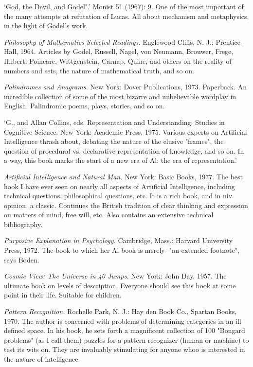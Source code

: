  `God, the Devil, and Godel".' Monist 51 (1967): 9. One of the most important of the many attempts at refutation of Lucas. All about mechanism and metaphysics, in the light of Godel's work.

 {\sl Philosophy of Mathematics-Selected Readings.} Englewood Cliffs, N. J.: Prentice-Hall, 1964. Articles by Godel, Russell, Nagel, von Neumann, Brouwer, Frege, Hilbert, Poincare, Wittgenstein, Carnap, Quine, and others on the reality of numbers and sets, the nature of mathematical truth, and so on.

 {\sl Palindromes and Anagrams.} \llap{*\enspace}New York: Dover Publications, 1973. Paperback. An incredible collection of some of the most bizarre and unbelievable wordplay in English. Palindromic poems, plays, stories, and so on.

 `G., and Allan Collins, eds. Representation and Understanding: Studies in Cognitive Science. New York: Academic Press, 1975. Various experts on Artificial Intelligence thrash about, debating the nature of the elusive "frames", the question of procedural vs. declarative representation of knowledge, and so on. In a way, this book marks the start of a new era of Al: the era of representation.' 

 {\sl Artificial Intelligence and Natural Man.} \llap{*\enspace}New York: Basic Books, 1977. The best hook I have ever seen on nearly all aspects of Artificial Intelligence, including technical questions, philosophical questions, etc. It is a rich book, and in niv opinion, a classic. Continues the British tradition of clear thinking and expression on matters of mind, free will, etc. Also contains an extensive technical bibliography.

 {\sl Purposive Explanation in Psychology.} Cambridge, Mass.: Harvard University Press, 1972. The book to which her Al book is merely- "an extended footnote", says Boden.

 {\sl Cosmic View: The Universe in 40 Jumps.} \llap{*\enspace}New York: John Day, 1957. The ultimate book on levels of description. Everyone should see this book at some point in their life. Suitable for children.

 {\sl Pattern Recognition.} \llap{**\enspace}Rochelle Park, N. J.: Hay den Book Co., Spartan Books, 1970. The author is concerned with problems of determining categories in an ill-defined space. In his book, he sets forth a magnificent collection of 100 "Bongard problems" (as I call them)-puzzles for a pattern recognizer (human or machine) to test its wits on. They are invaluably stimulating for anyone whoo is interested in the nature of intelligence.

